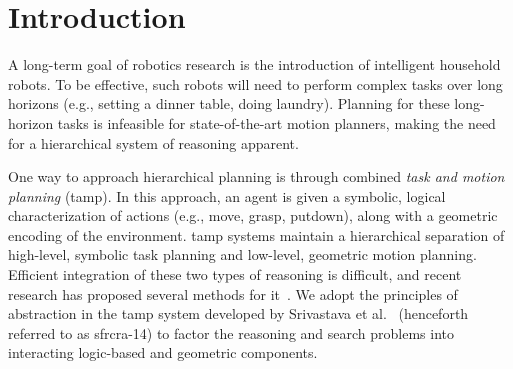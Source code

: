 \section{Introduction}
A long-term goal of robotics research is the introduction of
intelligent household robots.  To be effective, such robots will need
to perform complex tasks over long horizons (e.g., setting a dinner
table, doing laundry). Planning for these long-horizon tasks is
infeasible for state-of-the-art motion planners, making the need for a
hierarchical system of reasoning apparent.

One way to approach hierarchical planning is through combined
\emph{task and motion planning} ({\sc tamp}). In this approach, an agent is
given a symbolic, logical characterization of actions (e.g., move,
grasp, putdown), along with a geometric encoding of the
environment. {\sc tamp} systems maintain a hierarchical separation of
high-level, symbolic task planning and low-level, geometric motion
planning.  Efficient integration of these two types of reasoning is
difficult, and recent research has proposed several methods for
it~\cite{srivastava2014combined, deardenplanningtamp, kaelbling2011hierarchical,
  lagriffoul2014orientation, GarrettWAFR14, dornhege2012semantic}.
We adopt the principles of abstraction in the {\sc tamp} system developed by
Srivastava et al.~\cite{srivastava2014combined} (henceforth referred
to as {\sc sfrcra-14}) to factor the reasoning and search problems into
interacting logic-based and geometric components.

